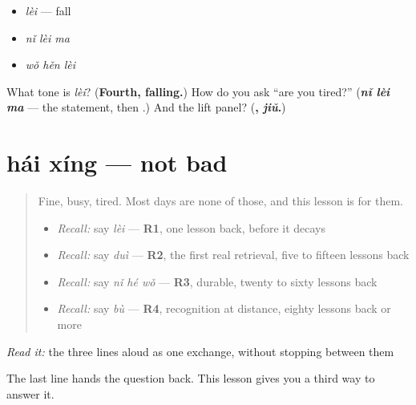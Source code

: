 \begin{itemize}
\raggedright
  \item \emph{lèi} — fall
  \item \emph{nǐ lèi ma}
  \item \emph{wǒ hěn lèi}
\end{itemize}

\begin{tcolorbox}[breakable,colback=teal!4,colframe=teal!35!black,title={Before you move on}]
What tone is \emph{lèi}? (\textbf{Fourth, falling.}) How do you ask \textquotedblleft{}are you tired?\textquotedblright{} (\emph{\textbf{nǐ lèi ma}} — the statement, then .) And the lift panel? (\textbf{, \emph{jiǔ}.})
\end{tcolorbox}
\section[hái xíng]{hái xíng — not bad}

\label{lesson:ZH-C30-haixing}



\begin{quote}
Fine, busy, tired. Most days are none of those, and this lesson is for them.

\begin{itemize}
\raggedright
  \item \emph{Recall:} say \emph{lèi} — \textbf{R1}, one lesson back, before it decays
  \item \emph{Recall:} say \emph{duì} — \textbf{R2}, the first real retrieval, five to fifteen lessons back
  \item \emph{Recall:} say \emph{nǐ hé wǒ} — \textbf{R3}, durable, twenty to sixty lessons back
  \item \emph{Recall:} say \emph{bù} — \textbf{R4}, recognition at distance, eighty lessons back or more
\end{itemize}
\end{quote}

\begin{tcolorbox}[breakable,skin=enhanced,colback=orange!6,colframe=orange!45!black,boxrule=0.5pt,arc=1mm,left=6pt,right=6pt,top=4pt,bottom=4pt,fonttitle=\bfseries,title={Read this}]
\begin{quote}
   
\end{quote}

\emph{Read it:} the three lines aloud as one exchange, without stopping between them

The last line hands the question back. This lesson gives you a third way to answer it.
\end{tcolorbox}

